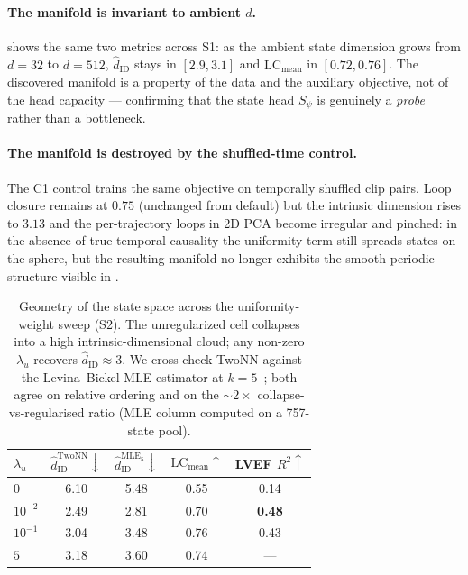 \documentclass[runningheads]{llncs}
\begin{document}
\paragraph{The manifold is invariant to ambient $d$.}
 shows the same two metrics across S1: as the ambient
state dimension grows from $d{=}32$ to $d{=}512$,
$\widehat{d}_\mathrm{ID}$ stays in $[2.9, 3.1]$ and
$\mathrm{LC}_\mathrm{mean}$ in $[0.72, 0.76]$. The discovered manifold is
a property of the data and the auxiliary objective, not of the head
capacity --- confirming that the state head $S_\psi$ is genuinely a
\emph{probe} rather than a bottleneck.

\paragraph{The manifold is destroyed by the shuffled-time control.}
The C1 control trains the same objective on temporally shuffled clip
pairs. Loop closure remains at $0.75$ (unchanged from default) but the
intrinsic dimension rises to $3.13$ and the
per-trajectory loops in 2D PCA become irregular and pinched:
in the absence of true temporal causality the uniformity term still
spreads states on the sphere, but the resulting manifold no longer
exhibits the smooth periodic structure visible in
.

\begin{table}[t]
\centering
\caption{Geometry of the state space across the uniformity-weight sweep
(S2). The unregularized cell collapses into a high intrinsic-dimensional
cloud; any non-zero $\lambda_u$ recovers $\widehat{d}_\mathrm{ID}\!\approx\!3$.
We cross-check TwoNN against the Levina--Bickel MLE estimator at
$k\!=\!5$~\cite{levina2004mle}; both agree on relative ordering and on
the $\sim\!2\times$ collapse-vs-regularised ratio (MLE column computed on
a 757-state pool).}
\label{tab:geometry}
\begin{tabular}{lcccc}
\toprule
$\lambda_u$ & $\widehat{d}_\mathrm{ID}^{\mathrm{TwoNN}}\downarrow$
            & $\widehat{d}_\mathrm{ID}^{\mathrm{MLE}_5}\downarrow$
            & $\mathrm{LC}_\mathrm{mean}\uparrow$
            & LVEF $R^2\uparrow$ \\
\midrule
$0$            & 6.10 & 5.48 & 0.55 & 0.14 \\
$10^{-2}$      & 2.49 & 2.81 & 0.70 & \textbf{0.48} \\
$10^{-1}$      & 3.04 & 3.48 & 0.76 & 0.43 \\
$5$            & 3.18 & 3.60 & 0.74 & --- \\
\bottomrule
\end{tabular}
\end{table}
\end{document}
